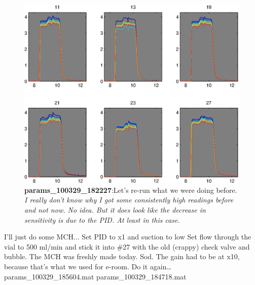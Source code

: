 \documentclass[a4paper]{report}
\begin{document}
\begin{figure}
\centering
\includegraphics[width=5in]{params_100329_182227.eps}
\caption{\textbf{params\_100329\_182227}:Let's re-run what we were
  doing before. \textit{I really don't know why I got some
    consistently high readings before and not now. No idea. But it
    does look like the decrease in sensitivity is due to the PID. At
    least in this case. } }
\end{figure}

I'll just do some MCH...
Set PID to x1 and suction to low
Set flow through the vial to 500 ml/min and stick it into \#27 with the
old (crappy) check valve and bubble. The MCH was freshly made today. 
Sod. The gain had to be at x10, because that's what we used for
e-room. Do it again\ldots params\_100329\_185604.mat
params\_100329\_184718.mat
\end{document}
